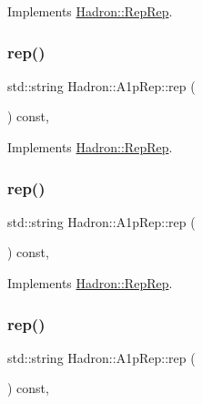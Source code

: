 Implements \mbox{\hyperlink{structHadron_1_1RepRep_ab3213025f6de249f7095892109575fde}{Hadron\+::\+Rep\+Rep}}.

\mbox{\label{structHadron_1_1A1pRep_a675f4c667a7e5d059a65b5ddad0321f3}} 
\subsubsection{\texorpdfstring{rep()}{rep()}\hspace{0.1cm}{\footnotesize\ttfamily [3/5]}}
{\footnotesize\ttfamily std\+::string Hadron\+::\+A1p\+Rep\+::rep (\begin{DoxyParamCaption}{ }\end{DoxyParamCaption}) const\hspace{0.3cm}{\ttfamily [inline]}, {\ttfamily [virtual]}}



Implements \mbox{\hyperlink{structHadron_1_1RepRep_ab3213025f6de249f7095892109575fde}{Hadron\+::\+Rep\+Rep}}.

\mbox{\label{structHadron_1_1A1pRep_a675f4c667a7e5d059a65b5ddad0321f3}} 
\subsubsection{\texorpdfstring{rep()}{rep()}\hspace{0.1cm}{\footnotesize\ttfamily [4/5]}}
{\footnotesize\ttfamily std\+::string Hadron\+::\+A1p\+Rep\+::rep (\begin{DoxyParamCaption}{ }\end{DoxyParamCaption}) const\hspace{0.3cm}{\ttfamily [inline]}, {\ttfamily [virtual]}}



Implements \mbox{\hyperlink{structHadron_1_1RepRep_ab3213025f6de249f7095892109575fde}{Hadron\+::\+Rep\+Rep}}.

\mbox{\label{structHadron_1_1A1pRep_a675f4c667a7e5d059a65b5ddad0321f3}} 
\subsubsection{\texorpdfstring{rep()}{rep()}\hspace{0.1cm}{\footnotesize\ttfamily [5/5]}}
{\footnotesize\ttfamily std\+::string Hadron\+::\+A1p\+Rep\+::rep (\begin{DoxyParamCaption}{ }\end{DoxyParamCaption}) const\hspace{0.3cm}{\ttfamily [inline]}, {\ttfamily [virtual]}}



